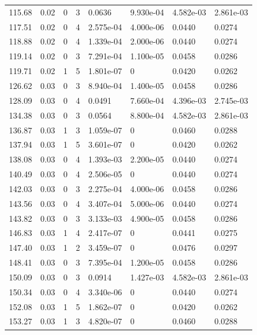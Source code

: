 \documentclass[preview]{standalone}
\begin{document}
{{{\begin{tabular}{L{1.2cm}C{1.2cm} C{0.3cm}C{0.5cm} C{1.4cm}C{1.4cm} C{1.4cm}C{1.4cm}}
  115.68  &  0.02  & 0     &  3 &  0.0636  & 9.930e-04  & 4.582e-03 &  2.861e-03   \\ 
  117.51  &  0.02  & 0     &  4 &  2.575e-04  & 4.000e-06  & 0.0440 &  0.0274   \\ 
  118.88  &  0.02  & 0     &  4 &  1.339e-04  & 2.000e-06  & 0.0440 &  0.0274   \\ 
  119.14  &  0.02  & 0     &  3 &  7.291e-04  & 1.100e-05  & 0.0458 &  0.0286   \\ 
  119.71  &  0.02  & 1     &  5 &  1.801e-07  & 0  & 0.0420 &  0.0262   \\ 
  126.62  &  0.03  & 0     &  3 &  8.940e-04  & 1.400e-05  & 0.0458 &  0.0286   \\ 
  128.09  &  0.03  & 0     &  4 &  0.0491  & 7.660e-04  & 4.396e-03 &  2.745e-03   \\ 
  134.38  &  0.03  & 0     &  3 &  0.0564  & 8.800e-04  & 4.582e-03 &  2.861e-03   \\ 
  136.87  &  0.03  & 1     &  3 &  1.059e-07  & 0  & 0.0460 &  0.0288   \\ 
  137.94  &  0.03  & 1     &  5 &  3.601e-07  & 0  & 0.0420 &  0.0262   \\ 
  138.08  &  0.03  & 0     &  4 &  1.393e-03  & 2.200e-05  & 0.0440 &  0.0274   \\ 
  140.49  &  0.03  & 0     &  4 &  2.506e-05  & 0  & 0.0440 &  0.0274   \\ 
  142.03  &  0.03  & 0     &  3 &  2.275e-04  & 4.000e-06  & 0.0458 &  0.0286   \\ 
  143.56  &  0.03  & 0     &  4 &  3.407e-04  & 5.000e-06  & 0.0440 &  0.0274   \\ 
  143.82  &  0.03  & 0     &  3 &  3.133e-03  & 4.900e-05  & 0.0458 &  0.0286   \\ 
  146.83  &  0.03  & 1     &  4 &  2.417e-07  & 0  & 0.0441 &  0.0275   \\ 
  147.40  &  0.03  & 1     &  2 &  3.459e-07  & 0  & 0.0476 &  0.0297   \\ 
  148.41  &  0.03  & 0     &  3 &  7.395e-04  & 1.200e-05  & 0.0458 &  0.0286   \\ 
  150.09  &  0.03  & 0     &  3 &  0.0914  & 1.427e-03  & 4.582e-03 &  2.861e-03   \\ 
  150.34  &  0.03  & 0     &  4 &  3.340e-06  & 0  & 0.0440 &  0.0274   \\ 
  152.08  &  0.03  & 1     &  5 &  1.862e-07  & 0  & 0.0420 &  0.0262   \\ 
  153.27  &  0.03  & 1     &  3 &  4.820e-07  & 0  & 0.0460 &  0.0288   \\ 

\end{tabular}}}}
\end{document}
